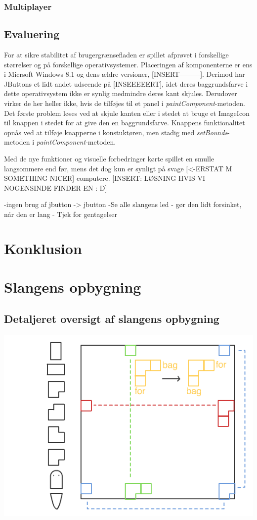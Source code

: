 \documentclass{report}
\begin{document}
\subsection{Multiplayer}

\section{Evaluering}
For at sikre stabilitet af brugergrænsefladen er spillet afprøvet i forskellige størrelser og på forskellige operativsystemer. Placeringen af komponenterne er ens i Micrsoft Windows 8.1 og dens ældre versioner, [INSERT---------]. Derimod har JButtons et lidt andet udseende på [INSEEEEERT], idet deres baggrundsfarve i dette operativsystem ikke er synlig medmindre deres kant skjules. Derudover virker de her heller ikke, hvis de tilføjes til et panel i \textit{paintComponent}-metoden. Det første problem løses ved at skjule kanten eller i stedet at bruge et ImageIcon til knappen i stedet for at give den en baggrundsfarve. Knappens funktionalitet opnås ved at tilføje knapperne i konstuktøren, men stadig med \textit{setBounds}-metoden i \textit{paintComponent}-metoden. 

Med de nye funktioner og visuelle forbedringer kørte spillet en smulle langsommere end før, mens det dog kun er synligt på svage [<-ERSTAT M SOMETHING NICER] computere. [INSERT: LØSNING HVIS VI NOGENSINDE FINDER EN : D]

-ingen brug af jbutton -> jbutton
-Se alle slangens led - gør den lidt forsinket, når den er lang
- Tjek for gentagelser



\chapter{Konklusion}
\pagebreak

\appendix
{}
\chapter{Slangens opbygning}
\section{Detaljeret oversigt af slangens opbygning}
\graphicspath{ {pics/} }
\includegraphics[width=1\textwidth]{SnakeGraphic.png}
\end{document}
